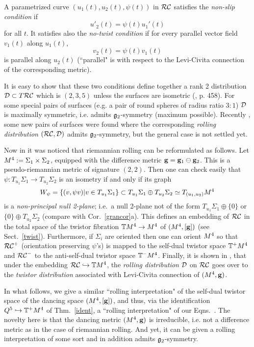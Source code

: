 A parametrized curve $(u_1(t), u_2(t), \psi(t))$ in $\mathcal{RC}$ satisfies the {\em non-slip condition} if 
$$u'_2(t)=\psi(t)u_1'(t)$$ 
for all $t$. It satisfies also the {\em no-twist condition}   if for every  parallel vector field $v_1(t)$   along $u_1(t)$, 
$$v_2(t)=\psi(t)v_1(t)$$
 is parallel along $u_2(t)$ (``parallel" is with respect to   the Levi-Civita connection of the corresponding metric). 

It is easy to show that these two conditions define together a rank 2 distribution ${\mathcal D}\subset T\mathcal{RC}$ which is $(2,3,5)$ unless the surfaces are isometric (\cite{BrHs}, p. 458). For some special pairs of surfaces (e.g. a pair of round spheres  of radius ratio $3:1$) ${\mathcal D}$ is maximally symmetric, i.e. admits ${\mathfrak{g}}_2$-symmetry (maximum possible). Recently \cite{AN}, some new pairs of surfaces were found where the corresponding {\em rolling distribution} $(\mathcal{RC}, {\mathcal D})$ admits ${\mathfrak{g}}_2$-symmetry, but the general case is not settled yet.  

Now  in \cite{AN} it was  noticed that  riemannian rolling can be reformulated as follows. 
Let $M^4:=\Sigma_1\times\Sigma_2$, equipped with the difference metric $\mathbf{ g}=\mathbf{ g}_1\ominus \mathbf{ g}_2$. 
This is a pseudo-riemannian metric of signature $(2,2)$. Then one can check easily that $\psi:T_{u_1}\Sigma_1\to T_{u_2}\Sigma_2$ is an isometry 
if and only if its graph 
$$W_\psi=\{(v,\psi v)|v \in T_{u_1}\Sigma_1\}\subset 
T_{u_1}\Sigma_1\oplus T_{u_2}\Sigma_2\simeq T_{(u_1,u_2)}M^4$$ 
is a {\em non-principal null 2-plane}; i.e.~a null 2-plane not of the form  $T_{u_1}\Sigma_1\oplus \{0\}$ or  $\{0\}\oplus T_{u_2}\Sigma_2$ (compare with Cor.~\ref{grancor}a). This defines an embedding  of $\mathcal{RC}$ in the total space of the twistor fibration $\mathbb{T} M^4\to M^4$ of $(M^4, [\mathbf{ g}])$ (see Sect.~\ref{twist}). Furthermore, if $\Sigma_i$ are oriented then  one can orient $M^4$ so that $\mathcal{RC}^+$ (orientation preserving $\psi$'s) is mapped to the self-dual twistor space  $\mathbb{T}^+M^4$ and $\mathcal{RC}^-$ to the anti-self-dual twistor space $\mathbb{T}^-M^4$. Finally, it is shown in \cite{AN}, that under the embedding $\mathcal{RC}\hookrightarrow\mathbb{T}M^4$, the {\em rolling distribution} ${\mathcal D}$ on $\mathcal{RC}$ goes over to the {\em twistor distribution} associated with  Levi-Civita connection of $(M^4, \mathbf{ g})$. 

 In what follows, we give a similar ``rolling interpretation" of the self-dual twistor space of  the dancing space $(M^4, [\mathbf{ g}])$, and thus, via the identification $Q^5\hookrightarrow \mathbb{T}^+M^4$ of Thm.~\ref{ident}, a ``rolling interpretation" of our Eqns.~\eqnsss. The novelty here is that the dancing metric $(M^4, \mathbf{ g})$ is irreducible, i.e.   not a difference metric as in the case of riemannian rolling. And yet,  it can be given a rolling interpretation of some sort and in addition   admits ${\mathfrak{g}}_2$-symmetry. 

